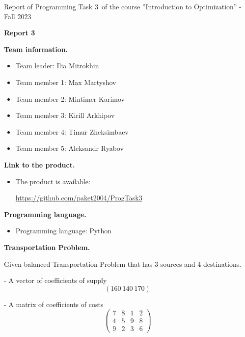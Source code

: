 \documentclass[12pt, legalpaper]{exam}
\newcommand{\course}{Introduction to Optimization}
\newcommand{\term}{Fall 2023}
\newcommand{\examnum}{Report of Programming Task 3}
\begin{document}
\noindent \examnum \, of the  course ''\course'' - \term


\noindent
{}




\vspace{12pt}
\begin{center}
    \textbf{Report 3}
\end{center}

\vspace{12pt}

\noindent  \textbf{Team information.}

\begin{itemize}
    \item Team leader: Ilia Mitrokhin
    \item Team member 1: Max Martyshov
    \item Team member 2: Mintimer Karimov
    \item Team member 3: Kirill Arkhipov
    \item Team member 4: Timur Zheksimbaev
    \item Team member 5: Aleksandr Ryabov
\end{itemize}
\vspace{12pt}
\noindent     \textbf{Link to the product.}
\begin{itemize}
    \item The product is available: 
    
    \url{https://github.com/paket2004/ProgTask3}
\end{itemize}

\vspace{12pt}

\noindent  \textbf{Programming language.}
\begin{itemize}
    \item Programming language: Python
\end{itemize}

\vspace{12pt}

\noindent  \textbf{Transportation Problem.}

Given balanced Transportation Problem that has 3 sources and 4 destinations.

- A vector of coefficients of supply
$$ (160 \: 140 \: 170) $$

- A matrix of coefficients of costs
$$ 
    \begin{pmatrix}
        7 & 8 & 1 & 2\\
        4 & 5 & 9 & 8\\
        9 & 2 & 3 & 6
    \end{pmatrix}
$$
\end{document}
